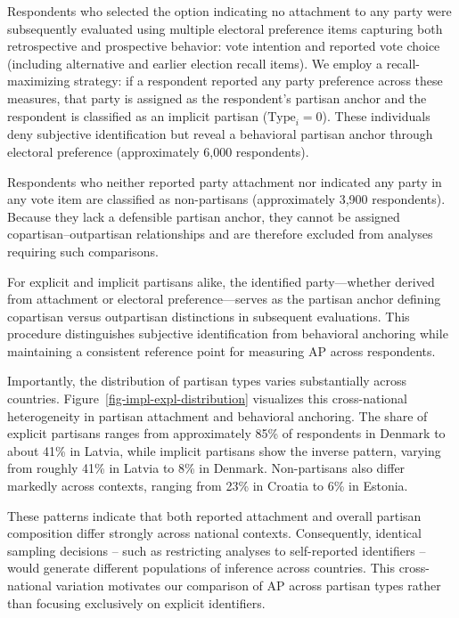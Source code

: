 \documentclass[
  12pt,
  a4paper,
  DIV=11,
  numbers=noendperiod]{scrartcl}
\begin{document}
Respondents who selected the option indicating no attachment to any
party were subsequently evaluated using multiple electoral preference
items capturing both retrospective and prospective behavior: vote
intention and reported vote choice (including alternative and earlier
election recall items). We employ a recall-maximizing strategy: if a
respondent reported any party preference across these measures, that
party is assigned as the respondent's partisan anchor and the respondent
is classified as an implicit partisan (\(\text{Type}_i = 0\)). These
individuals deny subjective identification but reveal a behavioral
partisan anchor through electoral preference (approximately 6,000
respondents).

Respondents who neither reported party attachment nor indicated any
party in any vote item are classified as non-partisans (approximately
3,900 respondents). Because they lack a defensible partisan anchor, they
cannot be assigned copartisan--outpartisan relationships and are
therefore excluded from analyses requiring such comparisons.

For explicit and implicit partisans alike, the identified
party---whether derived from attachment or electoral preference---serves
as the partisan anchor defining copartisan versus outpartisan
distinctions in subsequent evaluations. This procedure distinguishes
subjective identification from behavioral anchoring while maintaining a
consistent reference point for measuring AP across respondents.

Importantly, the distribution of partisan types varies substantially
across countries. Figure~\ref{fig-impl-expl-distribution} visualizes
this cross-national heterogeneity in partisan attachment and behavioral
anchoring. The share of explicit partisans ranges from approximately
85\% of respondents in Denmark to about 41\% in Latvia, while implicit
partisans show the inverse pattern, varying from roughly 41\% in Latvia
to 8\% in Denmark. Non-partisans also differ markedly across contexts,
ranging from 23\% in Croatia to 6\% in Estonia.

These patterns indicate that both reported attachment and overall
partisan composition differ strongly across national contexts.
Consequently, identical sampling decisions -- such as restricting
analyses to self-reported identifiers -- would generate different
populations of inference across countries. This cross-national variation
motivates our comparison of AP across partisan types rather than
focusing exclusively on explicit identifiers.
\end{document}
